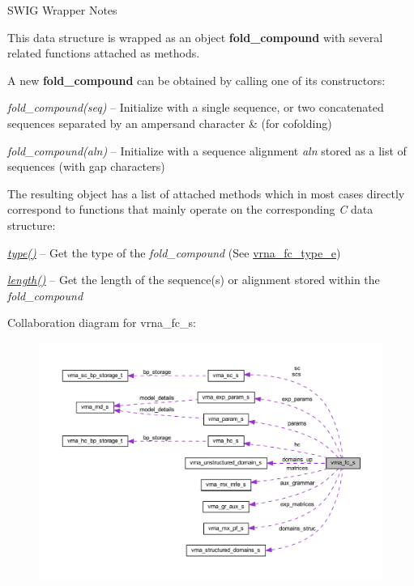 \begin{DoxyRefDesc}{S\+W\+I\+G Wrapper Notes}
\item[\hyperlink{wrappers__wrappers000039}{S\+W\+I\+G Wrapper Notes}]

This data structure is wrapped as an object {\bfseries fold\+\_\+compound} with several related functions attached as methods.

A new {\bfseries fold\+\_\+compound} can be obtained by calling one of its constructors\+:~\newline

\begin{DoxyItemize}
\item {\itshape fold\+\_\+compound(seq)} -- Initialize with a single sequence, or two concatenated sequences separated by an ampersand character \textquotesingle{}\&\textquotesingle{} (for cofolding)
\item {\itshape fold\+\_\+compound(aln)} -- Initialize with a sequence alignment {\itshape aln} stored as a list of sequences (with gap characters)
\end{DoxyItemize}The resulting object has a list of attached methods which in most cases directly correspond to functions that mainly operate on the corresponding {\itshape C} data structure\+:~\newline

\begin{DoxyItemize}
\item {\itshape \hyperlink{group__fold__compound_ac5eab693deac9a1a40c2a95ac294707c}{type()}} -- Get the type of the {\itshape fold\+\_\+compound} (See \hyperlink{group__fold__compound_ga01a4ff86fa71deaaa5d1abbd95a1447d}{vrna\+\_\+fc\+\_\+type\+\_\+e})
\item {\itshape \hyperlink{group__fold__compound_a95fbfed770b858e50c766505dc4bf998}{length()}} -- Get the length of the sequence(s) or alignment stored within the {\itshape fold\+\_\+compound} 
\end{DoxyItemize}\end{DoxyRefDesc}


Collaboration diagram for vrna\+\_\+fc\+\_\+s\+:
\nopagebreak
\begin{figure}[H]
\begin{center}
\leavevmode
\includegraphics[width=350pt]{structvrna__fc__s__coll__graph}
\end{center}
\end{figure}
